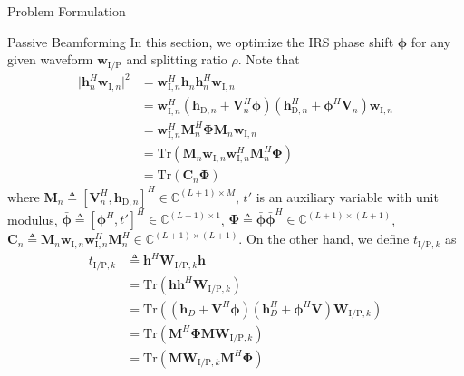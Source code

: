 \documentclass[journal]{IEEEtran}
\begin{document}
\begin{section}{Problem Formulation}
		\begin{subsection}{Passive Beamforming}
			In this section, we optimize the IRS phase shift $\boldsymbol{\phi}$ for any given waveform $\boldsymbol{w}_{\mathrm{I/P}}$ and splitting ratio $\rho$. Note that
			\begin{align}
				\lvert \boldsymbol{h}_{n}^H\boldsymbol{w}_{\mathrm{I},n} \rvert^2
				& = \boldsymbol{w}_{\mathrm{I},n}^H\boldsymbol{h}_n\boldsymbol{h}_n^H\boldsymbol{w}_{\mathrm{I},n}\nonumber\\
				& = \boldsymbol{w}_{\mathrm{I},n}^H(\boldsymbol{h}_{\mathrm{D},n}+\boldsymbol{V}_n^H\boldsymbol{\phi})(\boldsymbol{h}_{\mathrm{D},n}^H+\boldsymbol{\phi}^H\boldsymbol{V}_n)\boldsymbol{w}_{\mathrm{I},n}\nonumber\\
				& = \boldsymbol{w}_{\mathrm{I},n}^H\boldsymbol{M}_n^H\boldsymbol{\Phi}\boldsymbol{M}_n\boldsymbol{w}_{\mathrm{I},n}\nonumber\\
				& = \mathrm{Tr}(\boldsymbol{M}_n\boldsymbol{w}_{\mathrm{I},n}\boldsymbol{w}_{\mathrm{I},n}^H\boldsymbol{M}_n^H\boldsymbol{\Phi})\nonumber\\
				& = \mathrm{Tr}(\boldsymbol{C}_n\boldsymbol{\Phi})
			\end{align}
			where $\boldsymbol{M}_n \triangleq [\boldsymbol{V}_n^H, \boldsymbol{h}_{\mathrm{D},n}]^H \in \mathbb{C}^{(L+1) \times M}$, $t'$ is an auxiliary variable with unit modulus, $\bar{\boldsymbol{\phi}} \triangleq [\boldsymbol{\phi}^H, t']^H \in \mathbb{C}^{(L+1) \times 1}$, $\boldsymbol{\Phi} \triangleq \bar{\boldsymbol{\phi}}\bar{\boldsymbol{\phi}}^H \in \mathbb{C}^{(L+1) \times (L+1)}$, $\boldsymbol{C}_n \triangleq \boldsymbol{M}_n\boldsymbol{w}_{\mathrm{I},n}\boldsymbol{w}_{\mathrm{I},n}^H\boldsymbol{M}_n^H \in \mathbb{C}^{(L+1)\times(L+1)}$. On the other hand, we define $t_{\mathrm{I/P},k}$ as
			\begin{align}
				t_{\mathrm{I/P},k}
				& \triangleq \boldsymbol{h}^H\boldsymbol{W}_{\mathrm{I/P},k}\boldsymbol{h}\nonumber\\
				& = \mathrm{Tr}(\boldsymbol{h}\boldsymbol{h}^H\boldsymbol{W}_{\mathrm{I/P},k})\nonumber\\
				& = \mathrm{Tr}\left((\boldsymbol{h}_{D}+\boldsymbol{V}^H\boldsymbol{\phi})(\boldsymbol{h}_{D}^H+\boldsymbol{\phi}^H\boldsymbol{V})\boldsymbol{W}_{\mathrm{I/P},k}\right)\nonumber\\
				& = \mathrm{Tr}(\boldsymbol{M}^H\boldsymbol{\Phi}\boldsymbol{M}\boldsymbol{W}_{\mathrm{I/P},k})\nonumber\\
				& = \mathrm{Tr}(\boldsymbol{M}\boldsymbol{W}_{\mathrm{I/P},k}\boldsymbol{M}^H\boldsymbol{\Phi})\nonumber\\

\end{align}
\end{subsection}
\end{section}
\end{document}
